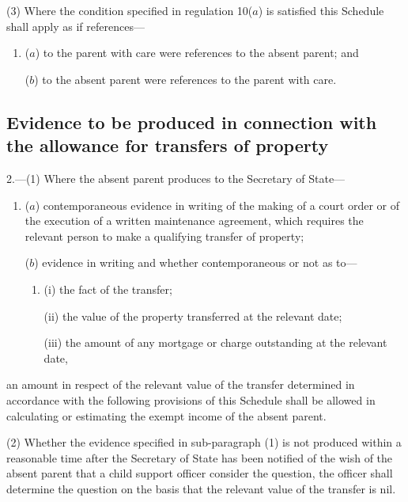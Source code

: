 \documentclass[12pt,a4paper]{article}
\begin{document}
(3) Where the condition specified in regulation 10($a$) is satisfied this Schedule shall apply as if references—
\begin{enumerate}\item[]
($a$) to the parent with care were references to the absent parent; and

($b$) to the absent parent were references to the parent with care.
\end{enumerate}


\subsection*{\sloppy Evidence to be produced in connection with the allowance for transfers of property}

2.—(1) Where the absent parent produces to the Secretary of State—
\begin{enumerate}\item[]
($a$) contemporaneous evidence in writing of the making of a court order or of the execution of a written maintenance agreement, which requires the relevant person to make a qualifying transfer of property;

($b$) evidence in writing and whether contemporaneous or not as to—
\begin{enumerate}\item[]
(i) the fact of the transfer;

(ii) the value of the property transferred at the relevant date;

(iii) the amount of any mortgage or charge outstanding at the relevant date,
\end{enumerate}
\end{enumerate}
an amount in respect of the relevant value of the transfer determined in accordance with the following provisions of this Schedule shall be allowed in calculating or estimating the exempt income of the absent parent.

(2) Whether the evidence specified in sub-paragraph (1) is not produced within a reasonable time after the Secretary of State has been notified of the wish of the absent parent that a child support officer consider the question, the officer shall determine the question on the basis that the relevant value of the transfer is nil.
\end{document}
